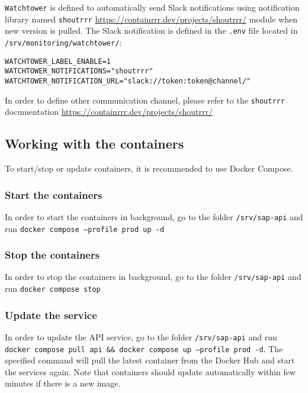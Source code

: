 \texttt{Watchtower} is defined to automatically send Slack notifications using notification library named \texttt{shoutrrr} \url{https://containrrr.dev/projects/shoutrrr/} module when new version is pulled. The Slack notification is defined in the \texttt{.env} file located in \texttt{/srv/monitoring/watchtower/}:
\begin{lstlisting}[caption={Watchtower environment variables}]
WATCHTOWER_LABEL_ENABLE=1
WATCHTOWER_NOTIFICATIONS="shoutrrr"
WATCHTOWER_NOTIFICATION_URL="slack://token:token@channel/"
\end{lstlisting}
In order to define other communication channel, please refer to the \texttt{shoutrrr} documentation \url{https://containrrr.dev/projects/shoutrrr/}

\subsection{Working with the containers}
To start/stop or update containers, it is recommended to use Docker Compose.
\subsubsection{Start the containers}
In order to start the containers in background, go to the folder \texttt{/srv/sap-api} and run \texttt{docker compose --profile prod up -d}

\subsubsection{Stop the containers}
In order to stop the containers in background, go to the folder \texttt{/srv/sap-api} and run \texttt{docker compose stop}

\subsubsection{Update the service}
In order to update the API service, go to the folder \texttt{/srv/sap-api} and run \texttt{docker compose pull api \&\& docker compose up --profile prod -d}.
The specified command will pull the latest container from the Docker Hub and start the services again.
Note that containers should update automatically
within few minutes if there is a new image.



